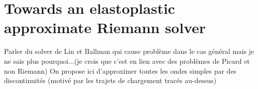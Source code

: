 

\section{Towards an elastoplastic approximate Riemann solver}
Parler du solver de Lin et Ballman qui cause problème dans le cas général mais je ne sais plus pourquoi...(je crois que c'est en lien avec des problèmes de Picard et non Riemann)
On propose ici d'approximer toutes les ondes simples par des discontinuités (motivé par les trajets de chargement tracés au-dessus)
\cite{Lin_et_Ballman}
